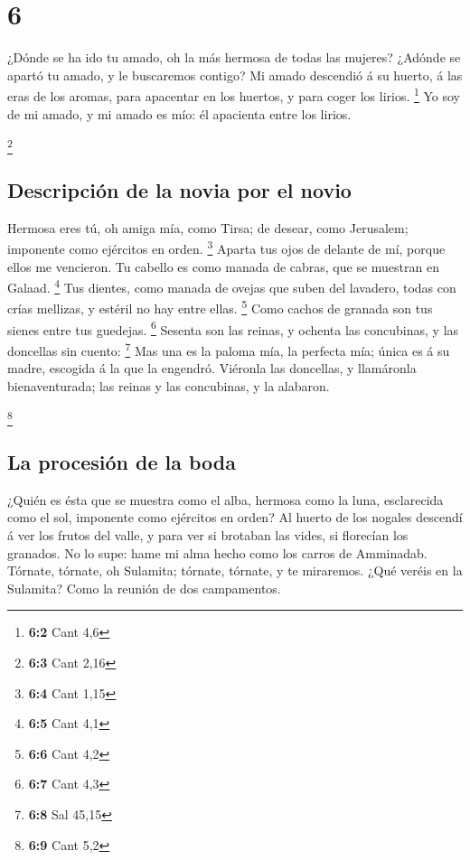 \hypertarget{section-5}{%
\section{6}\label{section-5}}

 ¿Dónde se ha ido tu amado, oh la más hermosa de todas las
mujeres? ¿Adónde se apartó tu amado, y le buscaremos contigo?
 Mi amado descendió á su huerto, á las eras de los aromas,
para apacentar en los huertos, y para coger los lirios. \footnote{\textbf{6:2}
  Cant 4,6}  Yo soy de mi amado, y mi amado es mío: él
apacienta entre los lirios.

\footnote{\textbf{6:3} Cant 2,16}

\hypertarget{descripciuxf3n-de-la-novia-por-el-novio-1}{%
\subsection{Descripción de la novia por el
novio}\label{descripciuxf3n-de-la-novia-por-el-novio-1}}

 Hermosa eres tú, oh amiga mía, como Tirsa; de desear,
como Jerusalem; imponente como ejércitos en orden. \footnote{\textbf{6:4}
  Cant 1,15}  Aparta tus ojos de delante de mí, porque
ellos me vencieron. Tu cabello es como manada de cabras, que se muestran
en Galaad. \footnote{\textbf{6:5} Cant 4,1}  Tus dientes,
como manada de ovejas que suben del lavadero, todas con crías mellizas,
y estéril no hay entre ellas. \footnote{\textbf{6:6} Cant 4,2}
 Como cachos de granada son tus sienes entre tus guedejas.
\footnote{\textbf{6:7} Cant 4,3}  Sesenta son las reinas,
y ochenta las concubinas, y las doncellas sin cuento: \footnote{\textbf{6:8}
  Sal 45,15}  Mas una es la paloma mía, la perfecta mía;
única es á su madre, escogida á la que la engendró. Viéronla las
doncellas, y llamáronla bienaventurada; las reinas y las concubinas, y
la alabaron.

\footnote{\textbf{6:9} Cant 5,2}

\hypertarget{la-procesiuxf3n-de-la-boda}{%
\subsection{La procesión de la boda}\label{la-procesiuxf3n-de-la-boda}}

 ¿Quién es ésta que se muestra como el alba, hermosa como
la luna, esclarecida como el sol, imponente como ejércitos en orden?
 Al huerto de los nogales descendí á ver los frutos del
valle, y para ver si brotaban las vides, si florecían los granados.
 No lo supe: hame mi alma hecho como los carros de
Amminadab.  Tórnate, tórnate, oh Sulamita; tórnate,
tórnate, y te miraremos. ¿Qué veréis en la Sulamita? Como la reunión de
dos campamentos.

